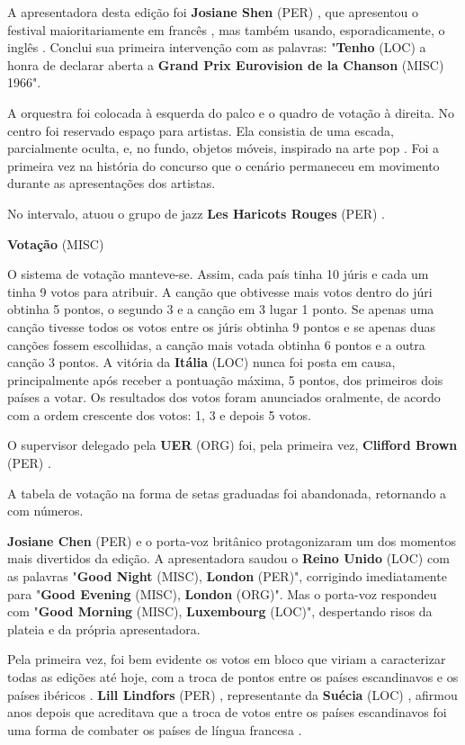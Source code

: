 \documentclass[12pt,a4paper]{article}
\begin{document}
A apresentadora desta edição foi \textbf{Josiane Shen} (PER) , que apresentou o festival maioritariamente em francês , mas também usando, esporadicamente, o inglês . Conclui sua primeira intervenção com as palavras: "\textbf{Tenho} (LOC) a honra de declarar aberta a \textbf{Grand Prix Eurovision de la Chanson} (MISC) 1966".

A orquestra foi colocada à esquerda do palco e o quadro de votação à direita. No centro foi reservado espaço para artistas. Ela consistia de uma escada, parcialmente oculta, e, no fundo, objetos móveis, inspirado na arte pop . Foi a primeira vez na história do concurso que o cenário permaneceu em movimento durante as apresentações dos artistas.

No intervalo, atuou o grupo de jazz \textbf{Les Haricots Rouges} (PER) .



\textbf{Votação} (MISC)

O sistema de votação manteve-se. Assim, cada país tinha 10 júris e cada um tinha 9 votos para atribuir. A canção que obtivesse mais votos dentro do júri obtinha 5 pontos, o segundo 3 e a canção em 3 lugar 1 ponto. Se apenas uma canção tivesse todos os votos entre os júris obtinha 9 pontos e se apenas duas canções fossem escolhidas, a canção mais votada obtinha 6 pontos e a outra canção 3 pontos. A vitória da \textbf{Itália} (LOC) nunca foi posta em causa, principalmente após receber a pontuação máxima, 5 pontos, dos primeiros dois países a votar. Os resultados dos votos foram anunciados oralmente, de acordo com a ordem crescente dos votos: 1, 3 e depois 5 votos.

O supervisor delegado pela \textbf{UER} (ORG) foi, pela primeira vez, \textbf{Clifford Brown} (PER) .

A tabela de votação na forma de setas graduadas foi abandonada, retornando a com números.

\textbf{Josiane Chen} (PER) e o porta-voz britânico protagonizaram um dos momentos mais divertidos da edição. A apresentadora saudou o \textbf{Reino Unido} (LOC) com as palavras "\textbf{Good Night} (MISC), \textbf{London} (PER)", corrigindo imediatamente para "\textbf{Good Evening} (MISC), \textbf{London} (ORG)". Mas o porta-voz respondeu com "\textbf{Good Morning} (MISC), \textbf{Luxembourg} (LOC)", despertando risos da plateia e da própria apresentadora.

Pela primeira vez, foi bem evidente os votos em bloco que viriam a caracterizar todas as edições até hoje, com a troca de pontos entre os países escandinavos e os países ibéricos . \textbf{Lill Lindfors} (PER) , representante da \textbf{Suécia} (LOC) , afirmou anos depois que acreditava que a troca de votos entre os países escandinavos foi uma forma de combater os países de língua francesa .
\end{document}
